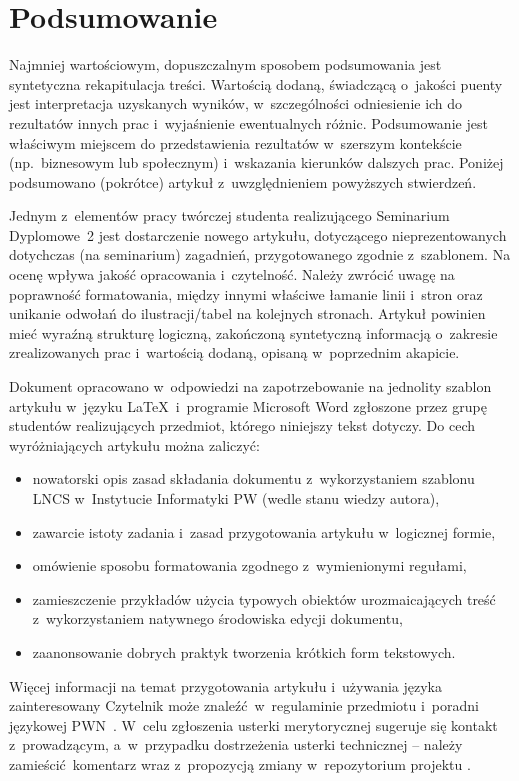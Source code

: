 \section{Podsumowanie}
\label{sec:summary}

Najmniej wartościowym, dopuszczalnym sposobem podsumowania jest syntetyczna rekapitulacja treści. Wartością dodaną, świadczącą o~jakości puenty jest interpretacja uzyskanych wyników, w~szczególności odniesienie ich do rezultatów innych prac i~wyjaśnienie ewentualnych różnic. Podsumowanie jest właściwym miejscem do przedstawienia rezultatów w~szerszym kontekście (np.~biznesowym lub społecznym) i~wskazania kierunków dalszych prac. Poniżej podsumowano (pokrótce) artykuł z~uwzględnieniem powyższych stwierdzeń.

Jednym z~elementów pracy twórczej studenta realizującego Seminarium Dyplomowe~2 jest dostarczenie nowego artykułu, dotyczącego nieprezentowanych dotychczas (na seminarium) zagadnień, przygotowanego zgodnie z~szablonem. Na ocenę wpływa jakość opracowania i~czytelność. Należy zwrócić uwagę na poprawność formatowania, między innymi właściwe łamanie linii i~stron oraz unikanie odwołań do ilustracji/tabel na kolejnych stronach. Artykuł powinien mieć wyraźną strukturę logiczną, zakończoną syntetyczną informacją o~zakresie zrealizowanych prac i~wartością dodaną, opisaną w~poprzednim akapicie.

Dokument opracowano w~odpowiedzi na zapotrzebowanie na jednolity szablon artykułu w~języku \LaTeX~i~programie Microsoft Word zgłoszone przez grupę studentów realizujących przedmiot, którego niniejszy tekst dotyczy. Do cech wyróżniających artykułu można zaliczyć:

\begin{itemize}
	\item nowatorski opis zasad składania dokumentu z~wykorzystaniem szablonu LNCS w~Instytucie Informatyki PW (wedle stanu wiedzy autora),
	\item zawarcie istoty zadania i~zasad przygotowania artykułu w~logicznej formie,
	\item omówienie sposobu formatowania zgodnego z~wymienionymi regułami,
	\item zamieszczenie przykładów użycia typowych obiektów urozmaicających treść z~wykorzystaniem natywnego środowiska edycji dokumentu,
	\item zaanonsowanie dobrych praktyk tworzenia krótkich form tekstowych.
\end{itemize}

Więcej informacji na temat przygotowania artykułu i~używania języka zainteresowany Czytelnik może znaleźć w~regulaminie przedmiotu i~poradni językowej PWN~\cite{ref:pwn}. W~celu zgłoszenia usterki merytorycznej sugeruje się kontakt z~prowadzącym, a~w~przypadku dostrzeżenia usterki technicznej -- należy zamieścić komentarz wraz z~propozycją zmiany w~repozytorium projektu \cite{ref:github}.
